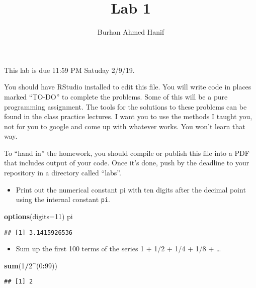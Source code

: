 \documentclass[]{article}
\title{Lab 1}
\author{Burhan Ahmed Hanif}
\date{}
\newenvironment{Shaded}{\begin{snugshade}}{\end{snugshade}}
\newcommand{\KeywordTok}[1]{\textcolor[rgb]{0.13,0.29,0.53}{\textbf{#1}}}
\newcommand{\DataTypeTok}[1]{\textcolor[rgb]{0.13,0.29,0.53}{#1}}
\newcommand{\DecValTok}[1]{\textcolor[rgb]{0.00,0.00,0.81}{#1}}
\newcommand{\OperatorTok}[1]{\textcolor[rgb]{0.81,0.36,0.00}{\textbf{#1}}}
\newcommand{\NormalTok}[1]{#1}
\providecommand{\tightlist}{%
  \setlength{\itemsep}{0pt}\setlength{\parskip}{0pt}}
\begin{document}
\maketitle

This lab is due 11:59 PM Satuday 2/9/19.

You should have RStudio installed to edit this file. You will write code
in places marked ``TO-DO'' to complete the problems. Some of this will
be a pure programming assignment. The tools for the solutions to these
problems can be found in the class practice lectures. I want you to use
the methods I taught you, not for you to google and come up with
whatever works. You won't learn that way.

To ``hand in'' the homework, you should compile or publish this file
into a PDF that includes output of your code. Once it's done, push by
the deadline to your repository in a directory called ``labs''.

\begin{itemize}
\tightlist
\item
  Print out the numerical constant pi with ten digits after the decimal
  point using the internal constant \texttt{pi}.
\end{itemize}

\begin{Shaded}
\begin{Highlighting}[]
\KeywordTok{options}\NormalTok{(}\DataTypeTok{digits=}\DecValTok{11}\NormalTok{)}
\NormalTok{pi}
\end{Highlighting}
\end{Shaded}

\begin{verbatim}
## [1] 3.1415926536
\end{verbatim}

\begin{itemize}
\tightlist
\item
  Sum up the first 100 terms of the series 1 + 1/2 + 1/4 + 1/8 +
  \ldots{}
\end{itemize}

\begin{Shaded}
\begin{Highlighting}[]
\KeywordTok{sum}\NormalTok{(}\DecValTok{1}\OperatorTok{/}\DecValTok{2}\OperatorTok{^}\NormalTok{(}\DecValTok{0}\OperatorTok{:}\DecValTok{99}\NormalTok{))}
\end{Highlighting}
\end{Shaded}

\begin{verbatim}
## [1] 2
\end{verbatim}
\end{document}
